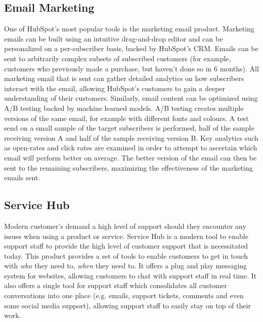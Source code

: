 \subsection{Email Marketing}
One of HubSpot's most popular tools is the marketing email product. Marketing emails can be built using an intuitive drag-and-drop editor and can be personalized on a per-subscriber basis, backed by HubSpot's CRM. Emails can be sent to arbitrarily complex subsets of subscribed customers (for example, customers who previously made a purchase, but haven't done so in 6 months). All marketing email that is sent can gather detailed analytics on how subscribers interact with the email, allowing HubSpot's customers to gain a deeper understanding of their customers. Similarly, email content can be optimized using A/B testing backed by machine learned models. A/B testing creates multiple versions of the same email, for example with different fonts and colours. A test send on a small sample of the target subscribers is performed, half of the sample receiving version A and half of the sample receiving version B. Key analytics such as open-rates and click rates are examined in order to attempt to ascertain which email will perform better on average. The better version of the email can then be sent to the remaining subscribers, maximizing the effectiveness of the marketing emails sent.

\subsection{Service Hub}
Modern customer's demand a high level of support should they encounter any issues when using a product or service. Service Hub is a modern tool to enable support staff to provide the high level of customer support that is necessitated today. This product provides a set of tools to enable customers to get in touch with \textit{who} they need to, \textit{when} they need to. It offers a plug and play messaging system for websites, allowing customers to chat with support staff in real time. It also offers a single tool for support staff which consolidates all customer conversations into one place (e.g. emails, support tickets, comments and even some social media support), allowing support staff to easily stay on top of their work. 


